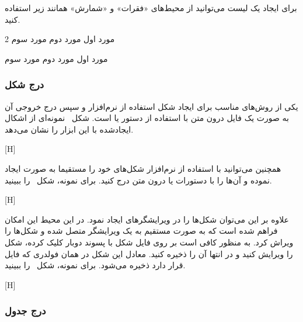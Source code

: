 برای ایجاد یک لیست‌ می‌توانید از محیط‌های «فقرات» و «شمارش» همانند زیر استفاده کنید.

\begin{multicols}{2}
   مورد اول
   مورد دوم
   مورد سوم

   مورد اول
   مورد دوم
   مورد سوم

\end{multicols}


\subsubsection{درج شکل}

یکی از روش‌های مناسب برای ایجاد شکل استفاده از نرم‌افزار  و سپس
درج خروجی آن به صورت یک فایل  درون متن
با استفاده از دستور   یا  است.
شکل~ نمونه‌ای از اشکال ایجادشده با این ابزار را نشان می‌دهد.


[H]

\bigskip
همچنین می‌توانید با استفاده از نرم‌افزار  شکل‌های خود را مستقیما به صورت  ایجاد نموده و آن‌ها را با دستورات  یا    درون متن درج کنید. برای نمونه، شکل~ را ببینید.


[H]

علاوه بر این می‌توان شکل‌ها را در ویرایشگرهای   ایجاد نمود. در این محیط این امکان فراهم شده است که به صورت مستقیم به یک ویرایشگر  متصل شده و شکل‌ها را ویراش کرد. به منظور کافی است بر روی فایل شکل با پسوند  دوبار کلیک کرده، شکل را ویرایش کنید و در انتها آن را ذخیره کنید. معادل  این شکل در همان فولدری که فایل  قرار دارد ذخیره می‌شود.
برای نمونه، شکل~ را ببینید.

[H]


\subsubsection{درج جدول}

